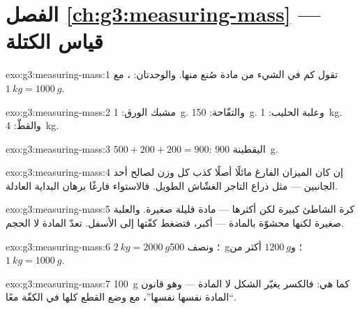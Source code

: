 \section*{الفصل \ref{ch:g3:measuring-mass} --- قياس الكتلة}

\begin{solution}{exo:g3:measuring-mass:1}
تقول كم في الشيء من مادة صُنع منها. والوحدتان: 
، مع $\qty{1}{kg} = \qty{1000}{g}$.
\end{solution}

\begin{solution}{exo:g3:measuring-mass:2}
مشبك الورق: \qty{1}{g}. والتفّاحة: \qty{150}{g}. وعلبة الحليب:
\qty{1}{kg}. والقطّ: \qty{4}{kg}.
\end{solution}

\begin{solution}{exo:g3:measuring-mass:3}
$500 + 200 + 200 = 900$:  اليقطينة \qty{900}{g}.
\end{solution}

\begin{solution}{exo:g3:measuring-mass:4}
إن كان الميزان الفارغ مائلًا أصلًا كذب كل وزن لصالح أحد
الجانبين --- مثل ذراع التاجر الغشّاش الطويل. فالاستواء فارغًا
برهان البداية العادلة.
\end{solution}

\begin{solution}{exo:g3:measuring-mass:5}
كرة الشاطئ كبيرة لكن أكثرها  --- مادة قليلة  صغيرة.
والعلبة صغيرة لكنها محشوّة بالمادة ---  أكبر، فتضغط كفّتها
إلى الأسفل.  تعدّ المادة لا الحجم.
\end{solution}

\begin{solution}{exo:g3:measuring-mass:6}
$\qty{2}{kg} = \qty{2000}{g}$؛ ونصف  \qty{500}{g}؛
و$\qty{1200}{g}$ أكثر من $\qty{1}{kg} = \qty{1000}{g}$.
\end{solution}

\begin{solution}{exo:g3:measuring-mass:7}
\qty{100}{g} كما هي: فالكسر يغيّر الشكل لا المادة --- وهو قانون
``المادة نفسها  نفسها''، مع وضع القطع كلها في الكفّة
معًا.
\end{solution}

